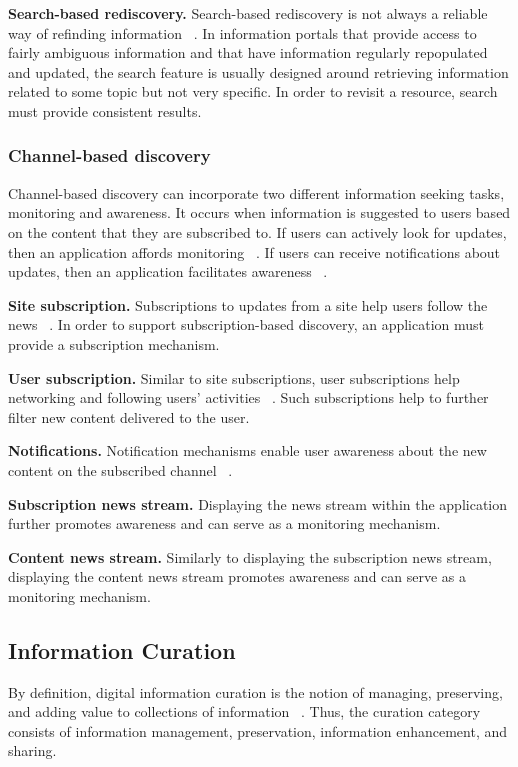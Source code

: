 \documentclass{casconpaper}
\begin{document}
{{\textbf{Search-based rediscovery.} Search-based rediscovery is not always a reliable way of refinding information ~\cite{cockburn}. In information portals that provide access to fairly ambiguous information and that have information regularly repopulated and updated, the search feature is usually designed around retrieving information related to some topic but not very specific. In order to revisit a resource, search must provide consistent results.

} %

{\subsubsection{Channel-based discovery}
Channel-based discovery can incorporate two different information seeking tasks, monitoring and awareness. It occurs when information is suggested to users based on the content that they are subscribed to. If users can actively look for updates, then an application affords monitoring ~\cite{morrison}. If users can receive notifications about updates, then an application facilitates awareness ~\cite{bates2002, bates1986}.                            


\textbf{Site subscription.} Subscriptions to updates from a site help users follow the news ~\cite{java}. In order to support subscription-based discovery, an application must provide a subscription mechanism.

\textbf{User subscription.} Similar to site subscriptions, user subscriptions help networking and following users' activities ~\cite{millen}. Such subscriptions help to further filter new content delivered to the user.

\textbf{Notifications.} Notification mechanisms enable user awareness about the  new content on the subscribed channel ~\cite{millen}. 

\textbf{Subscription news stream.} Displaying the news stream within the application further promotes awareness and can serve as a monitoring mechanism.

\textbf{Content news stream.} Similarly to displaying the subscription news stream, displaying the content news stream promotes awareness and can serve as a monitoring mechanism.

} %

{\subsection{Information Curation}
By definition, digital information curation is the notion of managing, preserving, and adding value to collections of information ~\cite{beagrie, wittaker}. Thus, the curation category consists of information management, preservation, information enhancement, and sharing.  
} %

}
\end{document}
